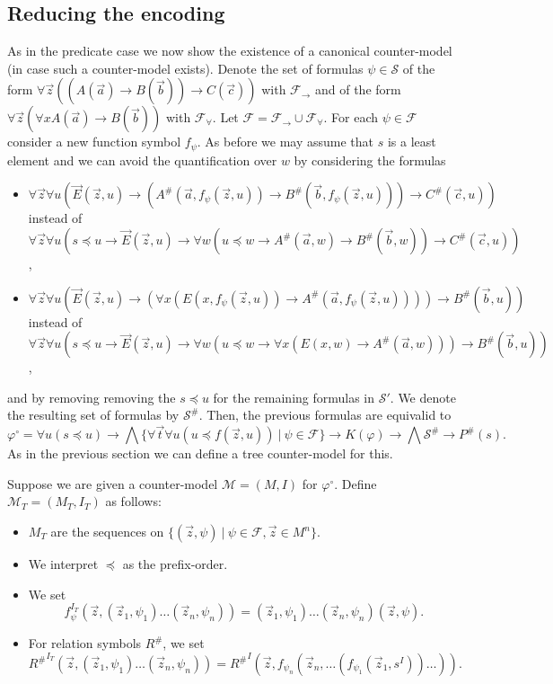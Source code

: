 \documentclass[runningheads]{llncs}
\begin{document}
\subsection{Reducing the encoding}

As in the predicate case we now show the existence of a canonical counter-model (in case such a counter-model exists). Denote the set of formulas $\psi\in\mathcal S$ of the form $\forall\vec z((A(\vec a)\to B(\vec b))\to C(\vec c))$ with $\mathcal F_\to$ and of the form $\forall \vec z(\forall xA(\vec a)\to B(\vec b))$ with $\mathcal F_\forall$. Let $\mathcal F = \mathcal F_\to\cup\mathcal F_\forall$. For each  $\psi\in\mathcal F$ consider a new function symbol $f_\psi$. As before we may assume that $s$ is a least element and we can avoid the quantification over $w$ by considering the formulas
\begin{itemize}
	\item $\forall \vec z\forall u(\vec E(\vec z, u)\to (A^\#(\vec a, f_\psi(\vec z, u))\to B^\#(\vec b, f_\psi(\vec z, u)))\to C^\#(\vec c, u))$\\instead of $\forall \vec z\forall u(s\preceq u\to\vec E(\vec z, u)\to \forall w(u\preceq w\to A^\#(\vec a, w)\to B^\#(\vec b, w))\to C^\#(\vec c, u))$,
	\item $\forall \vec z\forall u(\vec E(\vec z, u)\to (\forall x(E(x, f_\psi(\vec z, u))\to A^\#(\vec a, f_\psi(\vec z, u))))\to B^\#(\vec b, u))$\\instead of $\forall \vec z\forall u(s\preceq u\to\vec E(\vec z, u)\to \forall w(u\preceq w\to \forall x(E(x, w)\to A^\#(\vec a, w)))\to B^\#(\vec b, u))$,
\end{itemize}
and by removing removing the $s\preceq u$ for the remaining formulas in $\mathcal S'$.
We denote the resulting set of formulas by $\mathcal S^\#$.
Then, the previous formulas are equivalid to
$$\varphi^\circ= \forall u(s\preceq u)\to \bigwedge\{\forall \vec t\forall u(u\preceq f(\vec z, u))\:|\:\psi\in\mathcal F\}\to K(\varphi)\to\bigwedge\mathcal S^\#\to P^\#(s).$$
As in the previous section we can define a tree counter-model for this.

\begin{definition}
	Suppose we are given a counter-model $\mathcal M = (M, I)$ for $\varphi^\circ$. Define $\mathcal M_T = (M_T, I_T)$ as follows:
	\begin{itemize}
		\item $M_T$ are the sequences on $\{(\vec z, \psi)\:|\:\psi\in \mathcal F, \vec z\in M^n\}$.
		\item We interpret $\preceq$ as the prefix-order.
		\item We set $$f_\psi^{I_T}(\vec z, (\vec z_1, \psi_1)\dots (\vec z_n, \psi_n)) = (\vec z_1, \psi_1)\dots (\vec z_n, \psi_n)(\vec z, \psi).$$
		\item For relation symbols $R^\#$, we set $${R^\#}^{I_T}(\vec z, (\vec z_1, \psi_1)\dots (\vec z_n, \psi_n)) = {R^\#}^I(\vec z, f_{\psi_n}(\vec z_n, \dots(f_{\psi_1}(\vec z_1, s^I))\dots)).$$
	\end{itemize}
\end{definition}
\end{document}
